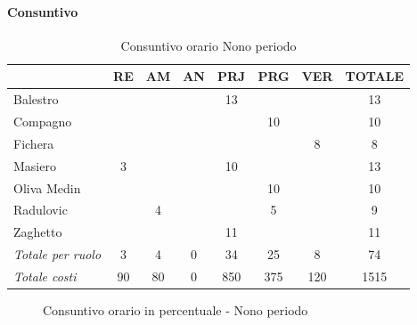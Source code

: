 \documentclass[a4paper,12pt]{article}
\begin{document}
            \paragraph{Consuntivo}
                \begin{table}[H]
                \centering
                \caption{Consuntivo orario Nono periodo}
                \begin{tabular}{|l|c|c|c|c|c|c|c|}
                \hline
                    \rowcolor{lightgray}{\textbf{Membro}} & {\textbf{RE}} & {\textbf{AM}} & {\textbf{AN}} & {\textbf{PRJ}} & {\textbf{PRG}} & {\textbf{VER}} & {\textbf{TOTALE}}\\
                \hline
                    Balestro & & & & 13 & & & 13\\
                \hline
                    Compagno & & & & & 10 & & 10\\
                \hline
                    Fichera & & & & & & 8 & 8\\
                \hline
                    Masiero & 3 & & & 10 & & & 13\\
                \hline
                    Oliva Medin & & & & & 10 & & 10\\
                \hline
                    Radulovic & & 4 & & & 5 & & 9\\
                \hline
                    Zaghetto & & & & 11 & & & 11\\
                \hline
                    \rowcolor{lightgray}\textit{Totale per ruolo} & 3 & 4 & 0 & 34 & 25 & 8 & 74\\
                \hline
                    \rowcolor{lightgray}\textit{Totale costi} & 90 & 80 & 0 & 850 & 375 & 120 & 1515\\
                \hline
                \end{tabular}
                \end{table}

                \begin{figure}[H]
                \centering
                \caption{Consuntivo orario in percentuale - Nono periodo}
                \end{figure}
                
\end{document}

